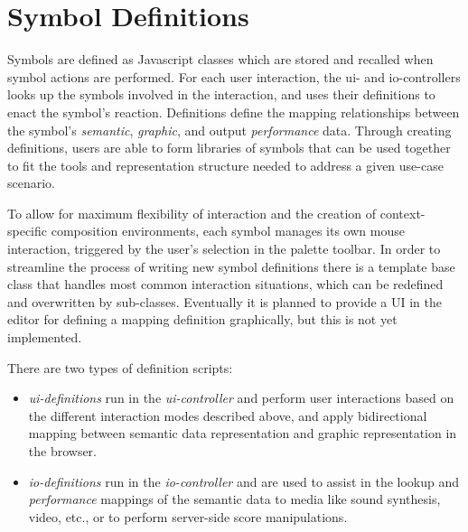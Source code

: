 \documentclass{article}
\def\uicontroller{\textit{ui-controller}\xspace}
\def\iocontroller{\textit{io-controller}\xspace}
\begin{document}
\section{Symbol Definitions}\label{library_definitions_api}

Symbols are defined as Javascript classes which are stored and recalled when symbol actions are performed. 
For each user interaction, the ui- and io-controllers looks up the symbols involved in the interaction, and uses their definitions to enact the symbol's reaction. 
Definitions define the mapping relationships between the symbol's \textit{semantic}, \textit{graphic}, and output \textit{performance} data.
Through creating definitions, users are able to form libraries of symbols that can be used together to fit the tools and representation structure needed to address a given use-case scenario.

To allow for maximum flexibility of interaction and the creation of context-specific composition environments, each symbol manages its own mouse interaction, triggered by the user's selection in the palette toolbar. 
In order to streamline the process of writing new symbol definitions there is a template base class that handles most common interaction situations, which can be redefined and overwritten by sub-classes. Eventually it is planned to provide a UI in the editor for defining a mapping definition graphically, but this is not yet implemented.

There are two types of definition scripts:
\begin{itemize}\itemsep0pt 
\item \textit{ui-definitions} run in the \uicontroller and perform user interactions based on the different interaction modes described above, and apply bidirectional mapping between semantic data representation and graphic representation in the browser.
\item \textit{io-definitions} run in the \iocontroller and are used to assist in the lookup and \textit{performance} mappings of the semantic data to media like sound synthesis, video, etc., or to perform server-side score manipulations.
\end{itemize}
\end{document}

